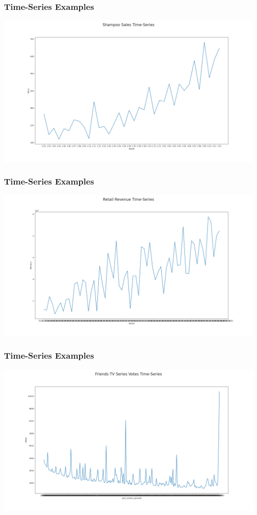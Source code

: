 \documentclass{beamer}
\begin{document}
\begin{frame}\frametitle{Time-Series Examples}
\includegraphics[width=\textwidth]{shampoo_ts}
\end{frame}

\begin{frame}\frametitle{Time-Series Examples}
\includegraphics[width=\textwidth]{retail_revenue_ts}
\end{frame}

\begin{frame}\frametitle{Time-Series Examples}
\includegraphics[width=\textwidth]{friends_episodes_votes_ts}
\end{frame}
\end{document}
